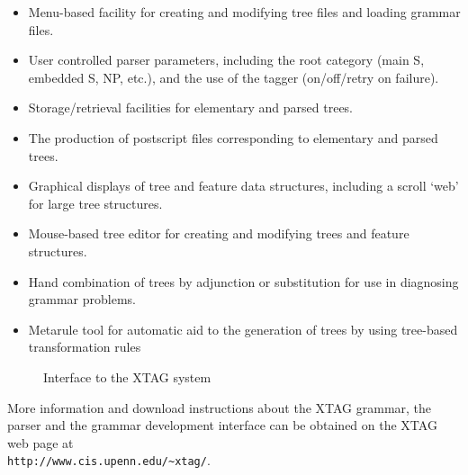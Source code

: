 \begin{itemize}

\item Menu-based facility for creating and modifying tree files and 
loading grammar files.

\item User controlled parser parameters, including the root
category (main S, embedded S, NP, etc.), and the use of the tagger
(on/off/retry on failure).

\item Storage/retrieval facilities for elementary and parsed trees.

\item The production of postscript files corresponding to elementary
and parsed trees.

\item Graphical displays of tree and feature data structures,
including a scroll `web' for large tree structures.

\item Mouse-based tree editor for creating and modifying trees and
feature structures.

\item Hand combination of trees by adjunction or substitution for use
in diagnosing grammar problems.

\item Metarule tool for automatic aid to the generation of trees by using 
tree-based transformation rules
 
\end{itemize}

\begin{figure}[htb]
\centering
\mbox{}
{}
\caption[XTAG Interface]{Interface to the XTAG system}
\label{xtag-interface}
\end{figure}

More information and download instructions about the XTAG grammar, the
parser and the grammar development interface can be obtained on the
XTAG web page at \\ {\tt http://www.cis.upenn.edu/\~{}xtag/}.

